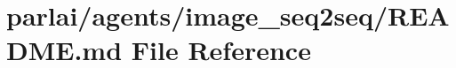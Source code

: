 \hypertarget{parlai_2agents_2image__seq2seq_2README_8md}{}\section{parlai/agents/image\+\_\+seq2seq/\+R\+E\+A\+D\+ME.md File Reference}
\label{parlai_2agents_2image__seq2seq_2README_8md}
